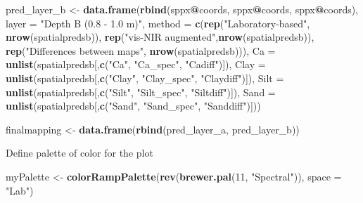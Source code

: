 \documentclass[]{book}
\newenvironment{Shaded}{\begin{snugshade}}{\end{snugshade}}
\newcommand{\DataTypeTok}[1]{\textcolor[rgb]{0.13,0.29,0.53}{#1}}
\newcommand{\DecValTok}[1]{\textcolor[rgb]{0.00,0.00,0.81}{#1}}
\newcommand{\KeywordTok}[1]{\textcolor[rgb]{0.13,0.29,0.53}{\textbf{#1}}}
\newcommand{\NormalTok}[1]{#1}
\newcommand{\OperatorTok}[1]{\textcolor[rgb]{0.81,0.36,0.00}{\textbf{#1}}}
\newcommand{\StringTok}[1]{\textcolor[rgb]{0.31,0.60,0.02}{#1}}
\begin{document}
\begin{Shaded}
\begin{Highlighting}[]
\NormalTok{pred_layer_b <-}\StringTok{ }\KeywordTok{data.frame}\NormalTok{(}\KeywordTok{rbind}\NormalTok{(sppx}\OperatorTok{@}\NormalTok{coords, }
\NormalTok{                                 sppx}\OperatorTok{@}\NormalTok{coords, }
\NormalTok{                                 sppx}\OperatorTok{@}\NormalTok{coords),}
                           \DataTypeTok{layer =} \StringTok{"Depth B (0.8 - 1.0 m)"}\NormalTok{,}
                           \DataTypeTok{method =} \KeywordTok{c}\NormalTok{(}\KeywordTok{rep}\NormalTok{(}\StringTok{"Laboratory-based"}\NormalTok{, }\KeywordTok{nrow}\NormalTok{(spatialpredsb)), }
                                      \KeywordTok{rep}\NormalTok{(}\StringTok{"vis-NIR augmented"}\NormalTok{,}\KeywordTok{nrow}\NormalTok{(spatialpredsb)),}
                                      \KeywordTok{rep}\NormalTok{(}\StringTok{"Differences between maps"}\NormalTok{, }\KeywordTok{nrow}\NormalTok{(spatialpredsb))), }
                           \DataTypeTok{Ca =} \KeywordTok{unlist}\NormalTok{(spatialpredsb[,}\KeywordTok{c}\NormalTok{(}\StringTok{"Ca"}\NormalTok{, }\StringTok{"Ca_spec"}\NormalTok{, }\StringTok{"Cadiff"}\NormalTok{)]),}
                           \DataTypeTok{Clay =} \KeywordTok{unlist}\NormalTok{(spatialpredsb[,}\KeywordTok{c}\NormalTok{(}\StringTok{"Clay"}\NormalTok{, }\StringTok{"Clay_spec"}\NormalTok{, }\StringTok{"Claydiff"}\NormalTok{)]),}
                           \DataTypeTok{Silt =} \KeywordTok{unlist}\NormalTok{(spatialpredsb[,}\KeywordTok{c}\NormalTok{(}\StringTok{"Silt"}\NormalTok{, }\StringTok{"Silt_spec"}\NormalTok{, }\StringTok{"Siltdiff"}\NormalTok{)]),}
                           \DataTypeTok{Sand =} \KeywordTok{unlist}\NormalTok{(spatialpredsb[,}\KeywordTok{c}\NormalTok{(}\StringTok{"Sand"}\NormalTok{, }\StringTok{"Sand_spec"}\NormalTok{, }\StringTok{"Sanddiff"}\NormalTok{)]))}

\NormalTok{finalmapping <-}\StringTok{ }\KeywordTok{data.frame}\NormalTok{(}\KeywordTok{rbind}\NormalTok{(pred_layer_a, pred_layer_b))}
\end{Highlighting}
\end{Shaded}

Define palette of color for the plot

\begin{Shaded}
\begin{Highlighting}[]
\NormalTok{myPalette <-}\StringTok{ }\KeywordTok{colorRampPalette}\NormalTok{(}\KeywordTok{rev}\NormalTok{(}\KeywordTok{brewer.pal}\NormalTok{(}\DecValTok{11}\NormalTok{, }\StringTok{"Spectral"}\NormalTok{)), }\DataTypeTok{space =} \StringTok{"Lab"}\NormalTok{)}
\end{Highlighting}
\end{Shaded}
\end{document}
